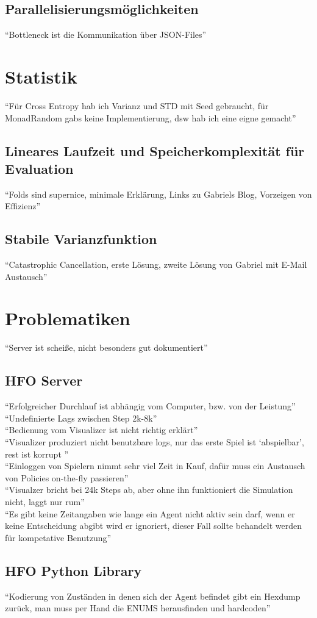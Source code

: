     \subsection{Parallelisierungsmöglichkeiten}
        ``Bottleneck ist die Kommunikation über JSON-Files''

\section{Statistik}
    ``Für Cross Entropy hab ich Varianz und STD mit Seed gebraucht, für MonadRandom gabs keine Implementierung, dsw hab ich eine eigne gemacht''
    \subsection{Lineares Laufzeit und Speicherkomplexität für Evaluation}
        ``Folds sind supernice, minimale Erklärung, Links zu Gabriels Blog, Vorzeigen von Effizienz''
    \subsection{Stabile Varianzfunktion}
        ``Catastrophic Cancellation, erste Lösung, zweite Lösung von Gabriel mit E-Mail Austausch''

\section{Problematiken}
    ``Server ist scheiße, nicht besonders gut dokumentiert''
    \subsection{HFO Server}
        ``Erfolgreicher Durchlauf ist abhängig vom Computer, bzw. von der Leistung'' \\
        ``Undefinierte Lags zwischen Step 2k-8k'' \\
        ``Bedienung vom Visualizer ist nicht richtig erklärt'' \\
        ``Visualizer produziert nicht benutzbare logs, nur das erste Spiel ist `abspielbar', rest ist korrupt '' \\
        ``Einloggen von Spielern nimmt sehr viel Zeit in Kauf, dafür muss ein Austausch von Policies on-the-fly passieren'' \\
        ``Visualzer bricht bei 24k Steps ab, aber ohne ihn funktioniert die Simulation nicht, laggt nur rum'' \\
        ``Es gibt keine Zeitangaben wie lange ein Agent nicht aktiv sein darf, wenn er keine Entscheidung abgibt wird er ignoriert, dieser Fall sollte behandelt werden für kompetative Benutzung''
    \subsection{HFO Python Library}
        ``Kodierung von Zuständen in denen sich der Agent befindet gibt ein Hexdump zurück, man muss per Hand die ENUMS herausfinden und hardcoden'' \\
